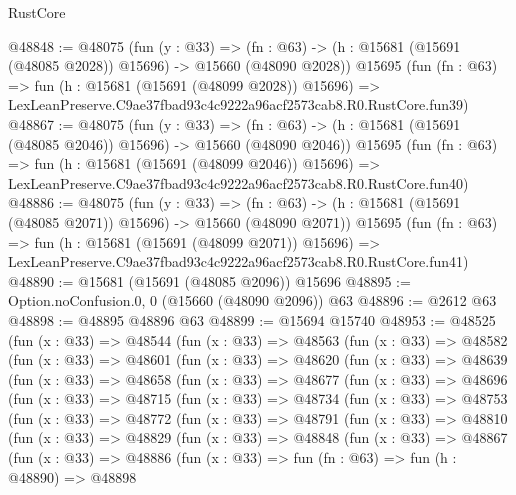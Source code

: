 \begin{lexlean}{RustCore}
\begin{coremodule}
@48848 := @48075
    (fun (y : @33) =>
    (fn : @63) -> (h : @15681 (@15691 (@48085 @2028)) @15696) -> @15660 (@48090 @2028))
    @15695
    (fun (fn : @63) =>
    fun (h : @15681 (@15691 (@48099 @2028)) @15696) =>
    LexLeanPreserve.C9ae37fbad93c4c9222a96acf2573cab8.R0.RustCore.fun39)
@48867 := @48075
    (fun (y : @33) =>
    (fn : @63) -> (h : @15681 (@15691 (@48085 @2046)) @15696) -> @15660 (@48090 @2046))
    @15695
    (fun (fn : @63) =>
    fun (h : @15681 (@15691 (@48099 @2046)) @15696) =>
    LexLeanPreserve.C9ae37fbad93c4c9222a96acf2573cab8.R0.RustCore.fun40)
@48886 := @48075
    (fun (y : @33) =>
    (fn : @63) -> (h : @15681 (@15691 (@48085 @2071)) @15696) -> @15660 (@48090 @2071))
    @15695
    (fun (fn : @63) =>
    fun (h : @15681 (@15691 (@48099 @2071)) @15696) =>
    LexLeanPreserve.C9ae37fbad93c4c9222a96acf2573cab8.R0.RustCore.fun41)
@48890 := @15681 (@15691 (@48085 @2096)) @15696
@48895 := Option.noConfusion.{0, 0} (@15660 (@48090 @2096)) @63
@48896 := @2612 @63
@48898 := @48895 @48896 @63
@48899 := @15694 @15740
@48953 := @48525
    (fun (x : @33) =>
    @48544
      (fun (x : @33) =>
      @48563
        (fun (x : @33) =>
        @48582
          (fun (x : @33) =>
          @48601
            (fun (x : @33) =>
            @48620
              (fun (x : @33) =>
              @48639
                (fun (x : @33) =>
                @48658
                  (fun (x : @33) =>
                  @48677
                    (fun (x : @33) =>
                    @48696
                      (fun (x : @33) =>
                      @48715
                        (fun (x : @33) =>
                        @48734
                          (fun (x : @33) =>
                          @48753
                            (fun (x : @33) =>
                            @48772
                              (fun (x : @33) =>
                              @48791
                                (fun (x : @33) =>
                                @48810
                                  (fun (x : @33) =>
                                  @48829
                                    (fun (x : @33) =>
                                    @48848
                                      (fun (x : @33) =>
                                      @48867
                                        (fun (x : @33) =>
                                        @48886
                                          (fun (x : @33) =>
                                          fun (fn : @63) =>
                                          fun (h : @48890) =>
                                          @48898

\end{coremodule}
\end{lexlean}
